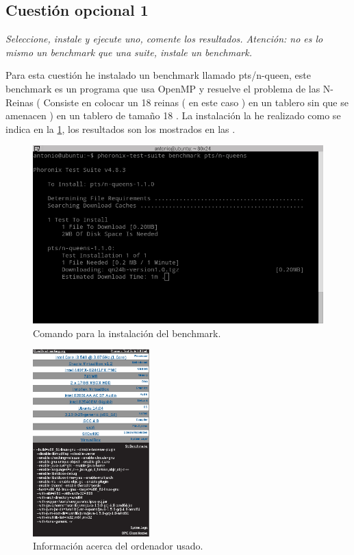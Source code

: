 \subsection{Cuestión opcional 1}
\textit{Seleccione, instale y ejecute uno, comente los resultados. Atención: no es lo mismo un benchmark que una suite, instale un benchmark.}
\newline

Para esta cuestión he instalado un benchmark llamado pts/n-queen, este benchmark es un programa que usa OpenMP y resuelve el problema de las N-Reinas ( Consiste en colocar un 18 reinas ( en este caso ) en un tablero sin que se amenacen ) en un tablero de tamaño 18 \cite{nr}. La instalación la he realizado como se indica en la \cref{fig13}, los resultados son los mostrados en las .

\begin{figure}[H]
  \begin{center}
    \includegraphics[width=1\textwidth]{imagenes/pho3}
    \caption{Comando para la instalación del benchmark.}
    \label{fig13}
  \end{center}
\end{figure}

\begin{figure}[H]
  \begin{center}
    \includegraphics[width=0.4\textwidth]{imagenes/pho4}
    \caption{Información acerca del ordenador usado.}
    \label{fig14}
  \end{center}
\end{figure}

